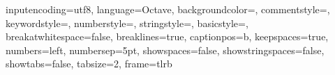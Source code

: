 





\usepackage[colorinlistoftodos]{todonotes}
\newcommand{\mynote}[1]{\todo[author=kks32,size=\small,inline,color=green!40]{#1}}

\usepackage{fancyvrb}
\usepackage{multicol}
\usepackage{listings}

\usepackage{color}
\usepackage{courier}


 {
	inputencoding=utf8,
	language=Octave,
	backgroundcolor=\color{white},
	commentstyle=\color{codegray},
	keywordstyle=\color{brownish},
	numberstyle=\tiny\color{codegray},
	stringstyle=\color{blueish},
	basicstyle=\scriptsize\ttfamily,
	breakatwhitespace=false,
	breaklines=true,
	captionpos=b,
	keepspaces=true,
	numbers=left,
	numbersep=5pt,
	showspaces=false,
	showstringspaces=false,
	showtabs=false,
	tabsize=2,
	frame=tlrb
}

\lstset{style=mystyle}
